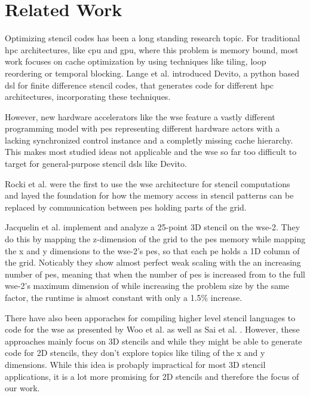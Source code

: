 \chapter{Related Work}
Optimizing stencil codes has been a long standing research topic.
For traditional \ac{hpc} architectures, like \ac{cpu} and \ac{gpu}, where this problem is memory bound, most work focuses on cache optimization by using techniques like tiling, loop reordering or temporal blocking.
Lange et al. \cite{lange2016devito} introduced Devito, a python based \ac{dsl} for finite difference stencil codes, that generates code for different \ac{hpc} architectures, incorporating these techniques.

However, new hardware accelerators like the \ac{wse} feature a vastly different programming model with \acp{pe} representing different hardware actors with a lacking synchronized control instance and a completly missing cache hierarchy. This makes most studied ideas not applicable and the \ac{wse} so far too difficult to target for general-purpose stencil \ac{dsl}s like Devito.

Rocki et al. \cite{rocki2020fast} were the first to use the \ac{wse} architecture for stencil computations and layed the foundation for how the memory access in stencil patterns can be replaced by communication between \ac{pe}s holding parts of the grid.

Jacquelin et al. \cite{jacquelin2022massively} implement and analyze a 25-point 3D stencil on the \ac{wse}-2.
They do this by mapping the z-dimension of the grid to the \ac{pe}s memory while mapping the x and y dimensions to the \ac{wse}-2's \ac{pe}s, so that each \ac{pe} holds a 1D column of the grid.
Noticably they show almost perfect weak scaling with the an increasing number of \ac{pe}s, meaning that when the number of \ac{pe}s is increased from  to the full \ac{wse}-2's maximum dimension of  while increasing the problem size by the same factor, the runtime is almost constant with only a 1.5\% increase.

There have also been apporaches for compiling higher level stencil languages to code for the \ac{wse} as presented by Woo et al. \cite{woo2022disruptive} as well as Sai et al. \cite{sai2024automated}. However, these approaches mainly focus on 3D stencils and while they might be able to generate code for 2D stencils, they don't explore topics like tiling of the x and y dimensions. While this idea is probaply impractical for most 3D stencil applications, it is a lot more promising for 2D stencils and therefore the focus of our work.